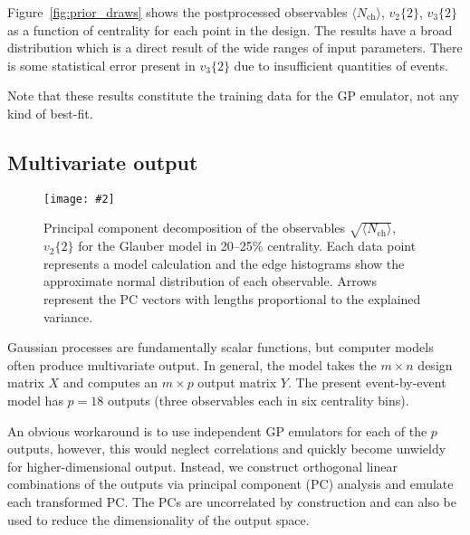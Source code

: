 \documentclass[aps,prc,reprint,superscriptaddress,amsmath]{revtex4-1}
\newcommand{\colfig}[3][t]{
  \begin{figure}[#1]
    \texttt{[image: \#2]}
    \caption{\label{fig:#2}#3}
  \end{figure}
}
\newcommand{\avg}[1]{\langle #1 \rangle}
\newcommand{\nch}{N_\text{ch}}
\newcommand{\vnk}[2]{v_#1\{#2\}}
\begin{document}
Figure~\ref{fig:prior_draws} shows the postprocessed observables $\avg\nch$, $\vnk 2 2$, $\vnk 3 2$ as a function of centrality for each point in the design.
The results have a broad distribution which is a direct result of the wide ranges of input parameters.
There is some statistical error present in $\vnk 3 2$ due to insufficient quantities of events.

Note that these results constitute the training data for the GP emulator, not any kind of best-fit.

\subsection{Multivariate output}

\colfig[b]{pc_scatter}{
  Principal component decomposition of the observables $\sqrt{\avg\nch}$, $\vnk 2 2$ for the Glauber model in 20--25\% centrality.
  Each data point represents a model calculation and the edge histograms show the approximate normal distribution of each observable.
  Arrows represent the PC vectors with lengths proportional to the explained variance.
}

Gaussian processes are fundamentally scalar functions, but computer models often produce multivariate output.
In general, the model takes the $m \times n$ design matrix $X$ and computes an $m \times p$ output matrix $Y$.
The present event-by-event model has $p = 18$ outputs (three observables each in six centrality bins).

An obvious workaround is to use independent GP emulators for each of the $p$ outputs, however, this would neglect correlations and quickly become unwieldy for higher-dimensional output.
Instead, we construct orthogonal linear combinations of the outputs via principal component (PC) analysis and emulate each transformed PC.
The PCs are uncorrelated by construction and can also be used to reduce the dimensionality of the output space.
\end{document}
